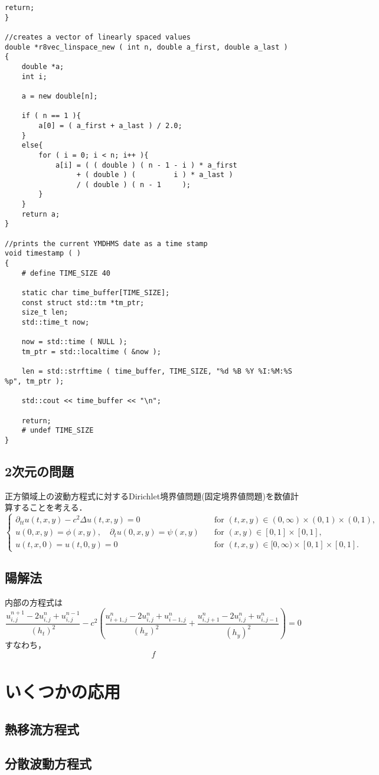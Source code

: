 \begin{lstlisting}[caption=C++のコード内からgnuplotを呼び出し$\sin x$を描く]
  	return;
}

//creates a vector of linearly spaced values
double *r8vec_linspace_new ( int n, double a_first, double a_last )
{
	double *a;
	int i;

  	a = new double[n];

  	if ( n == 1 ){
    	a[0] = ( a_first + a_last ) / 2.0;
    }
  	else{
    	for ( i = 0; i < n; i++ ){
		    a[i] = ( ( double ) ( n - 1 - i ) * a_first 
        	     + ( double ) (         i ) * a_last ) 
            	 / ( double ) ( n - 1     );
   		}
  	}
  	return a;
}

//prints the current YMDHMS date as a time stamp
void timestamp ( )
{
	# define TIME_SIZE 40

  	static char time_buffer[TIME_SIZE];
  	const struct std::tm *tm_ptr;
  	size_t len;
  	std::time_t now;

  	now = std::time ( NULL );
  	tm_ptr = std::localtime ( &now );

  	len = std::strftime ( time_buffer, TIME_SIZE, "%d %B %Y %I:%M:%S %p", tm_ptr );

  	std::cout << time_buffer << "\n";

  	return;
	# undef TIME_SIZE
}
\end{lstlisting}


\subsection{2次元の問題}
正方領域上の波動方程式に対するDirichlet境界値問題(固定境界値問題)を数値計算することを考える．
\begin{equation}
\label{e:wave2d}
	\begin{cases}
		\partial_{tt}u(t,x,y)-c^{2}\Delta u(t,x,y)=0\quad&\text{for $(t,x,y)\in(0,\infty)\times(0,1)\times(0,1)$,}\\
		u(0,x,y)=\phi(x,y),\quad \partial_{t}u(0,x,y)=\psi(x,y)\quad&\text{for $(x,y)\in[0,1]\times[0,1]$,}\\
		u(t,x,0)=u(t,0,y)=0\quad&\text{for $(t,x,y)\in[0,\infty)\times[0,1]\times[0,1]$.}
	\end{cases}
\end{equation}

\subsection{陽解法}


内部の方程式は
$$
\frac{u^{n+1}_{i,j}-2u^{n}_{i,j}+u^{n-1}_{i,j}}{(h_{t})^{2}}-c^{2}\left(\frac{u^{n}_{i+1,j}-2u^{n}_{i,j}+u^{n}_{i-1,j}}{(h_x)^{2}}+\frac{u^{n}_{i,j+1}-2u^{n}_{i,j}+u^{n}_{i,j-1}}{(h_y)^{2}}\right)=0
$$
すなわち，
$$
f
$$




\section{いくつかの応用}
\subsection{熱移流方程式}
\subsection{分散波動方程式}